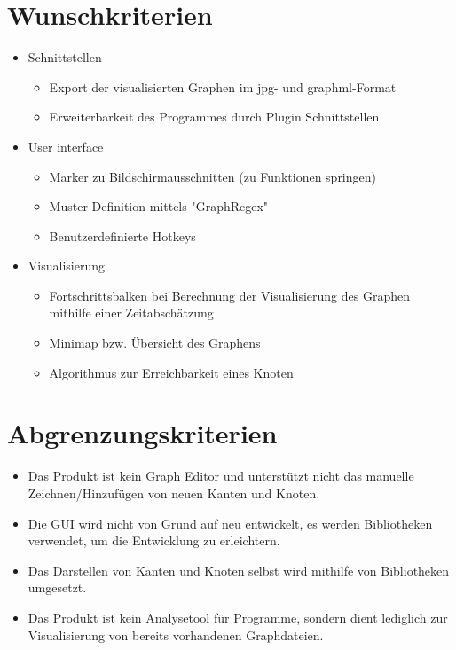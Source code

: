 \section{Wunschkriterien}

\begin{itemize}
\item Schnittstellen
\begin{itemize}
\item Export der visualisierten Graphen im \gls{jpg}- und \gls{graphml}-Format
\item Erweiterbarkeit des Programmes durch Plugin Schnittstellen
\end{itemize}
\item User interface
\begin{itemize}
\item Marker zu Bildschirmausschnitten (zu Funktionen springen)
\item Muster Definition mittels "GraphRegex"
\item Benutzerdefinierte Hotkeys
\end{itemize}
\item Visualisierung
\begin{itemize}
\item Fortschrittsbalken bei Berechnung der Visualisierung des Graphen mithilfe einer Zeitabschätzung
\item Minimap bzw. Übersicht des Graphens
\item Algorithmus zur Erreichbarkeit eines Knoten
\end{itemize}
\end{itemize}

\section{Abgrenzungskriterien}

\begin{itemize}
\item Das Produkt ist kein Graph Editor und unterstützt nicht das manuelle Zeichnen/Hinzufügen von neuen Kanten und Knoten.
\item Die GUI wird nicht von Grund auf neu entwickelt, es werden Bibliotheken verwendet, um die Entwicklung zu erleichtern. 
\item Das Darstellen von Kanten und Knoten selbst wird mithilfe von Bibliotheken umgesetzt.
\item Das Produkt ist kein Analysetool für Programme, sondern dient lediglich zur Visualisierung von bereits vorhandenen Graphdateien.
\end{itemize}